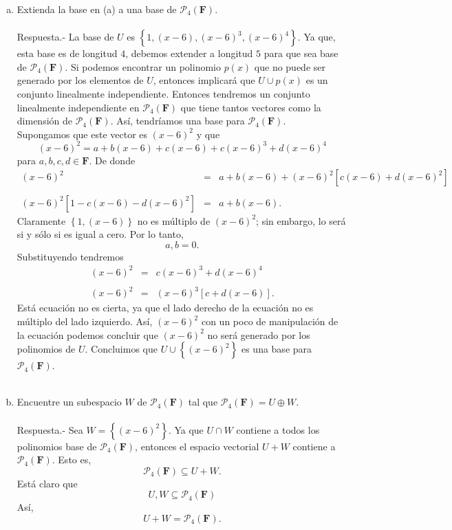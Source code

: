 \begin{enumerate}[\bfseries 1.]
\begin{enumerate}[(a)]
	    \item Extienda la base en (a) a una base de $\mathcal{P}_4(\textbf{F})$.\\\\
		Respuesta.-\; La base de $U$ es $\left\{1,(x-6),(x-6)^3,(x-6)^4\right\}$. Ya que, esta base es de longitud $4$, debemos extender a longitud $5$ para que sea base de $\mathcal{P}_4(\textbf{F})$.
		Si podemos encontrar un polinomio $p(x)$ que no puede ser generado por los elementos de $U$, entonces implicará que $U\cup p(x)$ es un conjunto linealmente independiente. Entonces tendremos un conjunto linealmente independiente en $\mathcal{P}_4(\textbf{F})$ que tiene tantos vectores como la dimensión de $\mathcal{P}_4(\textbf{F})$. Así, tendríamos una base para $\mathcal{P}_4(\textbf{F})$.\\

		Supongamos que este vector es $(x-6)^2$ y que 
		$$(x-6)^2=a+b(x-6)+c(x-6)+c(x-6)^3+d(x-6)^4$$
		para $a,b,c,d\in \textbf{F}$. De donde
		$$
		\begin{array}{rcl}
		    (x-6)^2 &=& a+b(x-6)+(x-6)^2\left[c(x-6)+d(x-6)^2\right]\\\\
		    (x-6)^2\left[1-c(x-6)-d(x-6)^2\right] &=& a+b(x-6).
		\end{array}
		$$
		Claramente $\left\{1,(x-6)\right\}$ no es múltiplo de $(x-6)^2$; sin embargo, lo será si y sólo si es igual a cero. Por lo tanto, 
		$$a,b=0.$$
		Substituyendo tendremos
		$$
		\begin{array}{rcl}	
		    (x-6)^2 &=& c(x-6)^3+d(x-6)^4\\\\
		    (x-6)^2 &=& (x-6)^3\left[c+d(x-6)\right].
		\end{array}
		$$
		Está ecuación no es cierta, ya que el lado derecho de la ecuación no es múltiplo del lado izquierdo. Así, $(x-6)^2$ con un poco de manipulación de la ecuación podemos concluir que $(x-6)^2$ no será generado por  los polinomios de $U$. Concluimos que $U\cup \left\{(x-6)^2\right\}$ es una base para $\mathcal{P}_4(\textbf{F})$.\\\\

	    \item Encuentre un subespacio $W$ de $\mathcal{P}_4(\textbf{F})$ tal que $\mathcal{P}_4(\textbf{F})=U\oplus W$.\\\\
		Respuesta.-\; Sea $W=\left\{(x-6)^2\right\}$. Ya que $U\cap W$ contiene a todos los polinomios base de $\mathcal{P}_4(\textbf{F})$, entonces el espacio vectorial $U+W$ contiene a $\mathcal{P}_4(\textbf{F})$. Esto es,
		$$\mathcal{P}_4(\textbf{F})\subseteq U+W.$$
		Está claro que 
		$$U,W\subseteq \mathcal{P}_4(\textbf{F})$$
		Así,
		$$U+W = \mathcal{P}_4(\textbf{F}).$$


\end{enumerate}
\end{enumerate}
